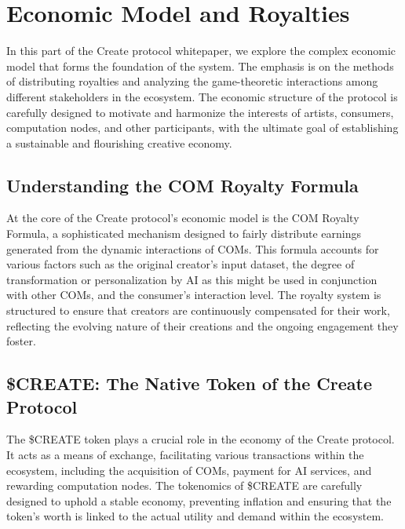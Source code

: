 \documentclass[12pt,a4paper]{article}
\begin{document}
\section{Economic Model and Royalties}

In this part of the Create protocol whitepaper, we explore the complex economic model that forms the foundation of the system. The emphasis is on the methods of distributing royalties and analyzing the game-theoretic interactions among different stakeholders in the ecosystem. The economic structure of the protocol is carefully designed to motivate and harmonize the interests of artists, consumers, computation nodes, and other participants, with the ultimate goal of establishing a sustainable and flourishing creative economy.

\subsection{Understanding the COM Royalty Formula}

At the core of the Create protocol's economic model is the COM Royalty Formula, a sophisticated mechanism designed to fairly distribute earnings generated from the dynamic interactions of COMs. This formula accounts for various factors such as the original creator's input dataset, the degree of transformation or personalization by AI as this might be used in conjunction with other COMs, and the consumer's interaction level. The royalty system is structured to ensure that creators are continuously compensated for their work, reflecting the evolving nature of their creations and the ongoing engagement they foster.

\subsection{\$CREATE: The Native Token of the Create Protocol}

The \$CREATE token plays a crucial role in the economy of the Create protocol. It acts as a means of exchange, facilitating various transactions within the ecosystem, including the acquisition of COMs, payment for AI services, and rewarding computation nodes. The tokenomics of \$CREATE are carefully designed to uphold a stable economy, preventing inflation and ensuring that the token's worth is linked to the actual utility and demand within the ecosystem.
\end{document}
